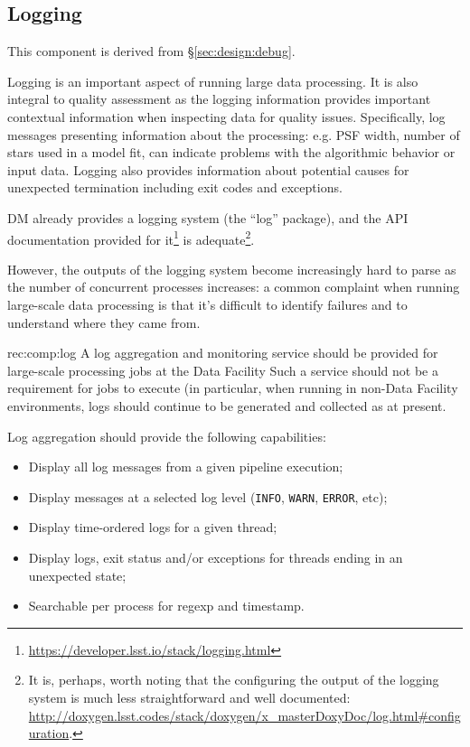 \subsection{Logging}
\label{sec:comp:log}

This component is derived from \S\ref{sec:design:debug}.

Logging is an important aspect of running large data processing.  It is also
integral to quality assessment as the logging information provides important
contextual information when inspecting data for quality issues.  Specifically,
log messages presenting information about the processing: e.g. PSF width,
number of stars used in a model fit, can indicate problems with the
algorithmic behavior or input data.  Logging also provides information about
potential causes for unexpected termination including exit codes and
exceptions.

DM already provides a logging system (the ``log'' package), and the API
documentation provided for
it\footnote{\url{https://developer.lsst.io/stack/logging.html}} is
adequate\footnote{It is, perhaps, worth noting that the configuring the output of the
logging system is much less straightforward and well documented:
\url{http://doxygen.lsst.codes/stack/doxygen/x_masterDoxyDoc/log.html\#configuration}.}.

However, the outputs of the logging system become increasingly hard to parse
as the number of concurrent processes increases: a common complaint when
running large-scale data processing is that it's difficult to identify
failures and to understand where they came from.

\begin{recommendation}
  {rec:comp:log}
  {A log aggregation and monitoring service should be provided for large-scale processing jobs at the Data Facility}
Such a service should not be a requirement for jobs to execute (in particular,
when running in non-Data Facility environments, logs should continue to be
generated and collected as at present.
\end{recommendation}

Log aggregation should provide the following capabilities:

\begin{itemize}
\item{Display all log messages from a given pipeline execution;}
\item{Display messages at a selected log level (\texttt{INFO}, \texttt{WARN}, \texttt{ERROR}, etc);}
\item{Display time-ordered logs for a given thread;}
\item{Display logs, exit status and/or exceptions for threads ending in an unexpected state;}
\item{Searchable per process for regexp and timestamp.}
\end{itemize}

